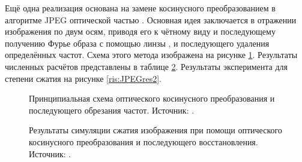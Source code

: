 \FloatBarrier\par
Ещё одна реализация основана на замене косинусного преобразованием в алгоритме JPEG оптической частью \cite{alkholidi2007new}. Основная идея заключается в отражении изображения по двум осям, приводя его к чётному виду и последующему получению Фурье образа с помощью линзы \cite{goodman2005introduction}, и последующего удаления определённых частот. Схема этого метода изображена на рисунке \ref{ris:JPEG}. Результаты численных расчётов представлены в таблице \ref{ris:JPEGres}. Результаты эксперимента для степени сжатия на рисунке \ref{ris:JPEGres2}.
\begin{figure}[htbp]
	\caption{Принципиальная схема оптического косинусного преобразования и последующего обрезания частот. Источник: \cite{alkholidi2007new}.}
	\label{ris:JPEG}
\end{figure}
\begin{figure}[htbp]
	\caption{Результаты симуляции сжатия изображения при помощи оптического косинусного преобразования и последующего восстановления. Источник: \cite{alkholidi2007new}.}
	\label{ris:JPEGres}
\end{figure}
